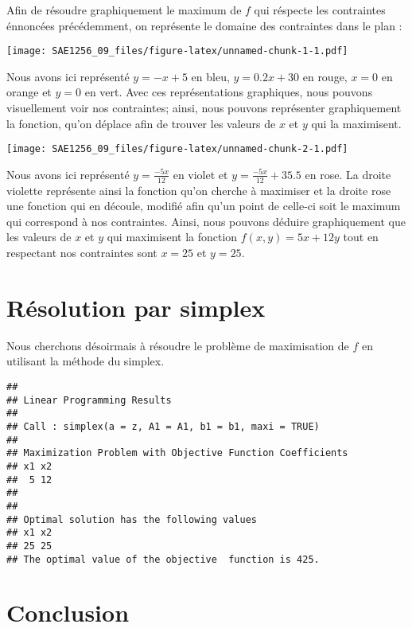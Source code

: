 \documentclass[
]{article}
\begin{document}
Afin de résoudre graphiquement le maximum de \(f\) qui réspecte les
contraintes énnoncées précédemment, on représente le domaine des
contraintes dans le plan :

\texttt{[image: SAE1256\_09\_files/figure-latex/unnamed-chunk-1-1.pdf]}

Nous avons ici représenté \(y = -x + 5\) en bleu, \(y = 0.2x + 30\) en
rouge, \(x = 0\) en orange et \(y = 0\) en vert. Avec ces
représentations graphiques, nous pouvons visuellement voir nos
contraintes; ainsi, nous pouvons représenter graphiquement la fonction,
qu'on déplace afin de trouver les valeurs de \(x\) et \(y\) qui la
maximisent.

\texttt{[image: SAE1256\_09\_files/figure-latex/unnamed-chunk-2-1.pdf]}

Nous avons ici représenté \(y = \frac{-5x}{12}\) en violet et
\(y = \frac{-5x}{12} + 35.5\) en rose. La droite violette représente
ainsi la fonction qu'on cherche à maximiser et la droite rose une
fonction qui en découle, modifié afin qu'un point de celle-ci soit le
maximum qui correspond à nos contraintes. Ainsi, nous pouvons déduire
graphiquement que les valeurs de \(x\) et \(y\) qui maximisent la
fonction \(f(x, y) = 5x + 12y\) tout en respectant nos contraintes sont
\(x = 25\) et \(y = 25\).

\section{Résolution par simplex}\label{ruxe9solution-par-simplex}

Nous cherchons désoirmais à résoudre le problème de maximisation de
\(f\) en utilisant la méthode du simplex.

\begin{verbatim}
## 
## Linear Programming Results
## 
## Call : simplex(a = z, A1 = A1, b1 = b1, maxi = TRUE)
## 
## Maximization Problem with Objective Function Coefficients
## x1 x2 
##  5 12 
## 
## 
## Optimal solution has the following values
## x1 x2 
## 25 25 
## The optimal value of the objective  function is 425.
\end{verbatim}

\section{Conclusion}\label{conclusion}
\end{document}
